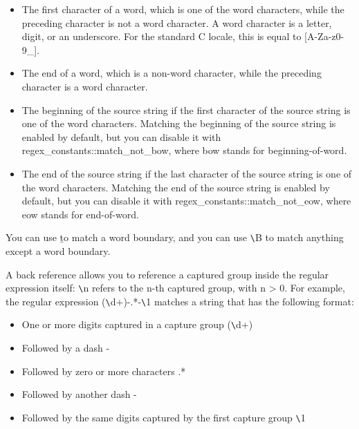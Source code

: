 \begin{itemize}
\item
The first character of a word, which is one of the word characters, while the preceding character is not a word character. A word character is a letter, digit, or an underscore. For the standard C locale, this is equal to [A-Za-z0-9\_].

\item
The end of a word, which is a non-word character, while the preceding character is a word character.

\item
The beginning of the source string if the first character of the source string is one of the word characters. Matching the beginning of the source string is enabled by default, but you can disable it with regex\_constants::match\_not\_bow, where bow stands for beginning-of-word.

\item
The end of the source string if the last character of the source string is one of the word characters. Matching the end of the source string is enabled by default, but you can disable it with regex\_constants::match\_not\_eow, where eow stands for end-of-word.
\end{itemize}

You can use \b to match a word boundary, and you can use  \verb|\|B to match anything except a word boundary.


A back reference allows you to reference a captured group inside the regular expression itself: \verb|\|n refers to the n-th captured group, with n > 0. For example, the regular expression (\verb|\|d+)-.*-\verb|\|1 matches a string that has the following format:

\begin{itemize}
\item
One or more digits captured in a capture group (\verb|\|d+)

\item
Followed by a dash -

\item
Followed by zero or more characters .*

\item
Followed by another dash -

\item
Followed by the same digits captured by the first capture group \verb|\|1
\end{itemize}

